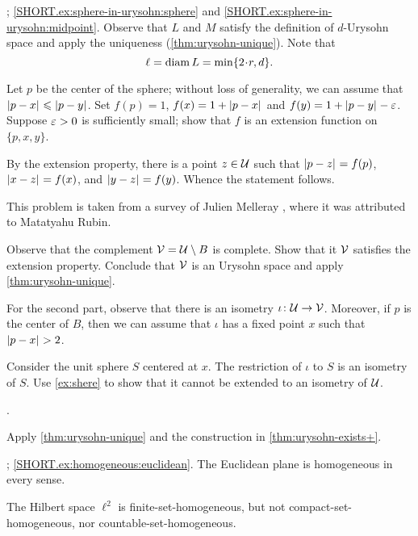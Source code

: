 


\parbf{\ref{ex:sphere-in-urysohn}}; \ref{SHORT.ex:sphere-in-urysohn:sphere} and \ref{SHORT.ex:sphere-in-urysohn:midpoint}.
Observe that $L$ and $M$ satisfy the definition of $d$-Urysohn space and apply the uniqueness (\ref{thm:urysohn-unique}).
Note that
\[\ell=\diam L=\min\{2\cdot r, d\}.\]

Let $p$ be the center of the sphere;
without loss of generality, we can assume that $\dist{p}{x}{}\le \dist{p}{y}{}$.
Set $f(p)=1$, $f(x)=1+\dist{p}{x}{}$ and $f(y)=1+\dist{p}{y}{}-\eps$.
Suppose $\varepsilon>0$ is sufficiently small;
show that $f$ is an extension function on $\{p,x,y\}$.

By the extension property, there is a point $z\in \mathcal{U}$ such that $\dist{p}{z}{}=f(p)$, $\dist{x}{z}{}=f(x)$, and $\dist{y}{z}{}=f(y)$.
Whence the statement follows.

 This problem is taken from a survey of Julien Melleray
 \cite[Prop. 4.3]{melleray}, where it was attributed to Matatyahu Rubin.


Observe that the complement $\mathcal{V}=\mathcal{U}\setminus B$ is complete.
Show that it $\mathcal{V}$ satisfies the extension property.
Conclude that $\mathcal{V}$ is an Urysohn space and apply \ref{thm:urysohn-unique}.

For the second part, observe that there is an isometry $\iota\colon\mathcal{U}\to \mathcal{V}$.
Moreover, if $p$ is the center of $B$, then we can assume that $\iota$ has a fixed point $x$ such that $\dist{p}{x}{}>2$.

Consider the unit sphere $S$ centered at $x$.
The restriction of $\iota$ to $S$ is an isometry of $S$.
Use \ref{ex:shere} to show that it cannot be extended to an isometry of $\mathcal{U}$.

 \cite[Sec. 4.4]{melleray}.

Apply \ref{thm:urysohn-unique} and the construction in \ref{thm:urysohn-exists+}.

\parbf{\ref{ex:homogeneous}}; \ref{SHORT.ex:homogeneous:euclidean}.
The Euclidean plane is homogeneous in every sense.

The Hilbert space $\ell^2$ is finite-set-homogeneous, but not compact-set-homogeneous, nor countable-set-homogeneous.

